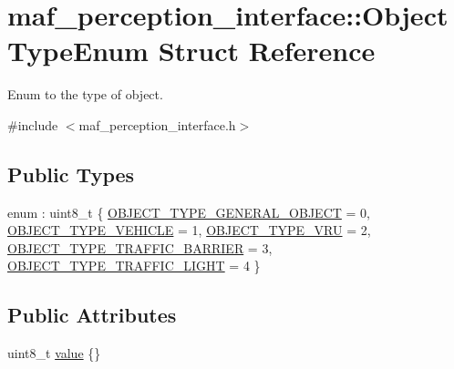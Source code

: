 \hypertarget{structmaf__perception__interface_1_1ObjectTypeEnum}{}\section{maf\+\_\+perception\+\_\+interface\+:\+:Object\+Type\+Enum Struct Reference}
\label{structmaf__perception__interface_1_1ObjectTypeEnum}


Enum to the type of object.  




{\ttfamily \#include $<$maf\+\_\+perception\+\_\+interface.\+h$>$}

\subsection*{Public Types}
\begin{DoxyCompactItemize}
\item 
enum \+: uint8\+\_\+t \{ \newline
\hyperlink{structmaf__perception__interface_1_1ObjectTypeEnum_a0feb8a86b2b3843588f264c80a218f7fa9c2891288210c345141cae799beb9aa0}{O\+B\+J\+E\+C\+T\+\_\+\+T\+Y\+P\+E\+\_\+\+G\+E\+N\+E\+R\+A\+L\+\_\+\+O\+B\+J\+E\+CT} = 0, 
\hyperlink{structmaf__perception__interface_1_1ObjectTypeEnum_a0feb8a86b2b3843588f264c80a218f7fa99a818e727bbd469fe80f018b4494275}{O\+B\+J\+E\+C\+T\+\_\+\+T\+Y\+P\+E\+\_\+\+V\+E\+H\+I\+C\+LE} = 1, 
\hyperlink{structmaf__perception__interface_1_1ObjectTypeEnum_a0feb8a86b2b3843588f264c80a218f7fa9b300434148acf993fd6baf457fb5b4c}{O\+B\+J\+E\+C\+T\+\_\+\+T\+Y\+P\+E\+\_\+\+V\+RU} = 2, 
\hyperlink{structmaf__perception__interface_1_1ObjectTypeEnum_a0feb8a86b2b3843588f264c80a218f7facba068fdceb68f8346638fcbcdbc6de6}{O\+B\+J\+E\+C\+T\+\_\+\+T\+Y\+P\+E\+\_\+\+T\+R\+A\+F\+F\+I\+C\+\_\+\+B\+A\+R\+R\+I\+ER} = 3, 
\newline
\hyperlink{structmaf__perception__interface_1_1ObjectTypeEnum_a0feb8a86b2b3843588f264c80a218f7faf24d152d5739a6c427f50375a946d1aa}{O\+B\+J\+E\+C\+T\+\_\+\+T\+Y\+P\+E\+\_\+\+T\+R\+A\+F\+F\+I\+C\+\_\+\+L\+I\+G\+HT} = 4
 \}
\end{DoxyCompactItemize}
\subsection*{Public Attributes}
\begin{DoxyCompactItemize}
\item 
uint8\+\_\+t \hyperlink{structmaf__perception__interface_1_1ObjectTypeEnum_ab948271918cea2c459f54f2295be1559}{value} \{\}
\end{DoxyCompactItemize}


